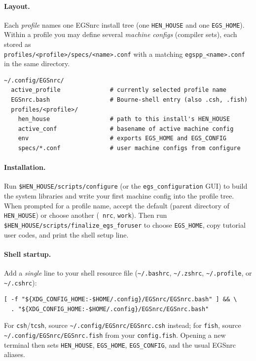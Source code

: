 \paragraph{Layout.}
Each {\em profile} names one EGSnrc install tree (one \verb+HEN_HOUSE+ and
one \verb+EGS_HOME+). Within a profile you may define several {\em machine
configs} (compiler sets), each stored as\\
\verb+profiles/<profile>/specs/<name>.conf+ with a matching
\verb+egspp_<name>.conf+ in the same directory.
\begin{verbatim}
~/.config/EGSnrc/
  active_profile              # currently selected profile name
  EGSnrc.bash                 # Bourne-shell entry (also .csh, .fish)
  profiles/<profile>/
    hen_house                 # path to this install's HEN_HOUSE
    active_conf               # basename of active machine config
    env                       # exports EGS_HOME and EGS_CONFIG
    specs/*.conf              # user machine configs from configure
\end{verbatim}

\paragraph{Installation.}
Run \verb+$HEN_HOUSE/scripts/configure+ (or the \verb+egs_configuration+ GUI)
to build the system libraries and write your first machine config into the
profile tree. When prompted for a profile name, accept the default
(parent directory of \verb+HEN_HOUSE+) or choose another
(\eg~\verb+nrc+, \verb+work+).
Then run \verb+$HEN_HOUSE/scripts/finalize_egs_foruser+ to choose
\verb+EGS_HOME+, copy tutorial user codes, and print the shell setup line.

\paragraph{Shell startup.}
Add a {\em single} line to your shell resource file
(\verb+~/.bashrc+, \verb+~/.zshrc+, \verb+~/.profile+, or \verb+~/.cshrc+):
\begin{verbatim}
[ -f "${XDG_CONFIG_HOME:-$HOME/.config}/EGSnrc/EGSnrc.bash" ] && \
  . "${XDG_CONFIG_HOME:-$HOME/.config}/EGSnrc/EGSnrc.bash"
\end{verbatim}
For {\tt csh}/{\tt tcsh}, source \verb+~/.config/EGSnrc/EGSnrc.csh+ instead;
for {\tt fish}, source \verb+~/.config/EGSnrc/EGSnrc.fish+ from your
\verb+config.fish+.
Opening a new terminal then sets \verb+HEN_HOUSE+, \verb+EGS_HOME+,
\verb+EGS_CONFIG+, and the usual EGSnrc aliases.

